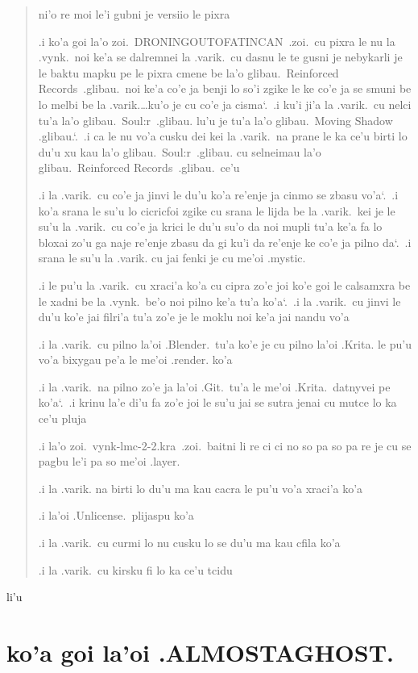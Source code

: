 \documentclass{report}
\newcommand\sds{\spacefactor\sfcode`.\ \space}
\begin{document}
\begin{quote}
	ni'o re moi le'i gubni je versiio le pixra


	.i ko'a goi la'o zoi.\ DRONINGOUTOFATINCAN\ .zoi.\ cu pixra le nu la .vynk.\ noi ke'a se dalremnei la .varik.\ cu dasnu le te gusni je nebykarli je le baktu mapku pe le pixra cmene be la'o glibau.\ Reinforced Records\ .glibau.\ noi ke'a co'e ja benji lo so'i zgike le ke co'e ja se smuni be lo melbi be la .varik.\ldots ku'o je cu co'e ja cisma\sds  .i ku'i ji'a la .varik.\ cu nelci tu'a la'o glibau.\ Soul:r\ .glibau. lu'u je tu'a la'o glibau.\ Moving Shadow .glibau.\sds  .i ca le nu vo'a cusku dei kei la .varik.\ na prane le ka ce'u birti lo du'u xu kau la'o glibau.\ Soul:r\ .glibau. cu selneimau la'o glibau.\ Reinforced Records\ .glibau.\ ce'u

	.i la .varik.\ cu co'e ja jinvi le du'u ko'a re'enje ja cinmo se zbasu vo'a\sds  .i ko'a srana le su'u lo cicricfoi zgike cu srana le lijda be la .varik.\ kei je le su'u la .varik.\ cu co'e ja krici le du'u su'o da noi mupli tu'a ke'a fa lo bloxai zo'u ga naje re'enje zbasu da gi ku'i da re'enje ke co'e ja pilno da\sds  .i srana le su'u la .varik. cu jai fenki je cu me'oi .mystic.

	.i le pu'u la .varik.\ cu xraci'a ko'a cu cipra zo'e joi ko'e goi le calsamxra be le xadni be la .vynk.\ be'o noi pilno ke'a tu'a ko'a\sds  .i la .varik.\ cu jinvi le du'u ko'e jai filri'a tu'a zo'e je le moklu noi ke'a jai nandu vo'a

	.i la .varik.\ cu pilno la'oi .Blender.\ tu'a ko'e je cu pilno la'oi .Krita. le pu'u vo'a bixygau pe'a le me'oi .render. ko'a

	.i la .varik.\ na pilno zo'e ja la'oi .Git.\ tu'a le me'oi .Krita.\ datnyvei pe ko'a\sds  .i krinu la'e di'u fa zo'e joi le su'u jai se sutra jenai cu mutce lo ka ce'u pluja

	.i la'o zoi.\ vynk-lmc-2-2.kra\ .zoi.\ baitni li re ci ci no so pa so pa re je cu se pagbu le'i pa so me'oi .layer.

	.i la .varik. na birti lo du'u ma kau cacra le pu'u vo'a xraci'a ko'a

	.i la'oi .Unlicense.\ plijaspu ko'a

	.i la .varik.\ cu curmi lo nu cusku lo se du'u ma kau cfila ko'a

	.i la .varik.\ cu kirsku fi lo ka ce'u tcidu
\end{quote}

li'u

\chapter{ko'a goi la'oi .ALMOSTAGHOST.}\label{sec:almostaghost}
\end{document}
